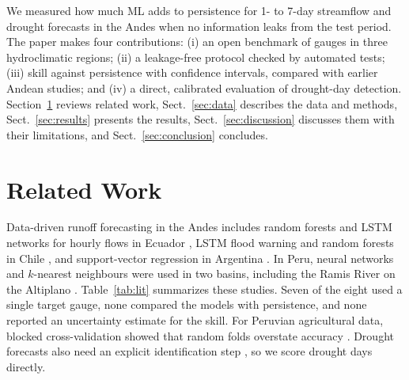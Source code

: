\documentclass[graybox]{svmult}
\begin{document}
We measured how much ML adds to persistence for 1- to 7-day streamflow and drought forecasts in the Andes when no information leaks from the test period. The paper makes four contributions: (i) an open benchmark of \nGauges{} gauges in three hydroclimatic regions; (ii) a leakage-free protocol checked by automated tests; (iii) skill against persistence with confidence intervals, compared with earlier Andean studies; and (iv) a direct, calibrated evaluation of drought-day detection. Section~\ref{sec:related} reviews related work, Sect.~\ref{sec:data} describes the data and methods, Sect.~\ref{sec:results} presents the results, Sect.~\ref{sec:discussion} discusses them with their limitations, and Sect.~\ref{sec:conclusion} concludes.

\section{Related Work}
\label{sec:related}

Data-driven runoff forecasting in the Andes includes random forests and LSTM networks for hourly flows in Ecuador \cite{munoz2018rf,contreras2021rf,merizalde2023lstm}, LSTM flood warning and random forests in Chile \cite{delafuente2019lstm,nunez2023xai}, and support-vector regression in Argentina \cite{teverovsky2023svr}. In Peru, neural networks and $k$-nearest neighbours were used in two basins, including the Ramis River on the Altiplano \cite{ramos2023crisnejas,quispe2023ramis}. Table~\ref{tab:lit} summarizes these studies. Seven of the eight used a single target gauge, none compared the models with persistence, and none reported an uncertainty estimate for the skill. For Peruvian agricultural data, blocked cross-validation showed that random folds overstate accuracy \cite{torres2026blockedcv}. Drought forecasts also need an explicit identification step \cite{sutanto2021definitions}, so we score drought days directly.
\end{document}
